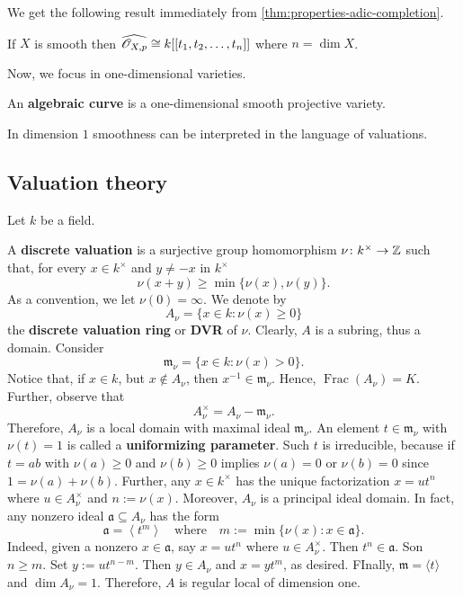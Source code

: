 We get the following result immediately from \cref{thm:properties-adic-completion}.
\begin{corollary}\label{cor:smooth-iff-isomorphic-to-power-series}
	If $X$ is smooth then $\widehat{{\mathscr O}_{X,p}} \cong k[[t_{1}, t_{2}, \ldots, t_{n}]]$ where $n = \dim X$.
\end{corollary}
Now, we focus in one-dimensional varieties.
\begin{definition}\label{def:algebraic-curve}
	An \textbf{algebraic curve} is a one-dimensional smooth projective variety.
\end{definition}
In dimension $1$ smoothness can be interpreted in the language of valuations.
\subsection*{Valuation theory}
Let $k$ be a field. 
\begin{definition}\label{def:discrete-valuation}
	A \textbf{discrete valuation} is a surjective group homomorphism $\nu\colon k^{\times} \to {\mathbb Z}$ such that, for every $x\in k^{\times}$ and $y \neq -x$ in $k^{\times}$
	\[
		\nu(x + y) \geq \min\{\nu(x), \nu(y)\}.
	\]
	As a convention, we let $\nu(0) = \infty$. We denote by
	\[
	A_{\nu} = \{x \in k\colon \nu(x)\geq 0\}
	\]
	the \textbf{discrete valuation ring} or \textbf{DVR} of $\nu$. Clearly, $A$ is a subring, thus a domain. Consider
	\[
		\mathfrak{m}_{\nu} = \{x\in k\colon \nu(x) > 0\}. 
	\]
	Notice that, if $x\in k$, but $x\notin A_{\nu}$, then $x^{-1}\in \mathfrak{m}_{\nu}$. Hence, $\operatorname{Frac}(A_{\nu}) = K$. Further, observe that
	\[
	A_{\nu}^{\times} = A_{\nu} - \mathfrak{m}_{\nu}.
	\]
	Therefore, $A_{\nu}$ is a local domain with maximal ideal $\mathfrak{m}_{\nu}$. An element $t \in \mathfrak{m}_{\nu}$ with $\nu(t) = 1$ is called a \textbf{uniformizing parameter}. Such $t$ is irreducible, because if $t = ab$ with $\nu(a)\geq 0$ and $\nu(b)\geq 0$ implies $\nu(a) = 0$ or $\nu(b) = 0$ since $1 = \nu(a) + \nu(b)$. Further, any $x \in k^{\times}$ has the unique factorization $x = u t^{n}$ where $u \in A_{\nu}^{\times}$ and $n := \nu(x)$. Moreover, $A_{\nu}$ is a principal ideal domain. In fact, any nonzero ideal $\mathfrak{a} \subseteq A_{\nu}$ has the form
	\[
		\mathfrak{a} = \left\langle t^{m}\right\rangle \quad\text{where}\quad m:=\min\{\nu(x)\colon x\in \mathfrak{a}\}.
	\]
	Indeed, given a nonzero $x \in \mathfrak{a}$, say $x = ut^{n}$ where $u \in A_{\nu}^{\times}$. Then $t^{n}\in \mathfrak{a}$. Son $n \geq m$. Set $y := ut^{n-m}$. Then $y\in A_\nu$ and $x = yt^{m}$, as desired. FInally, $\mathfrak{m} = \langle t\rangle$ and $\dim A_{\nu} = 1$. Therefore, $A$ is regular local of dimension one.
\end{definition}
